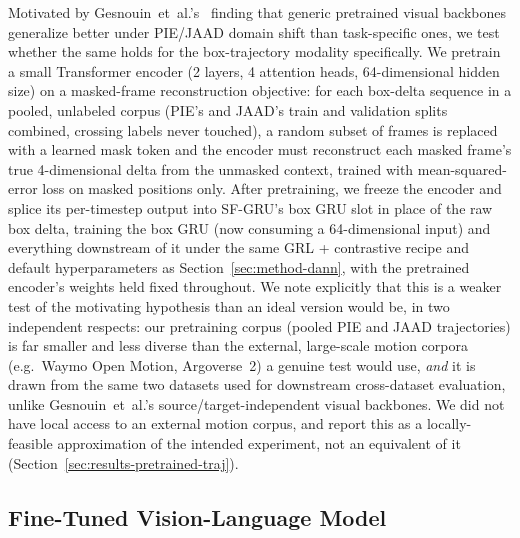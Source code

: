 Motivated by Gesnouin~et~al.'s~\cite{gesnouin2022} finding that generic
pretrained visual backbones generalize better under PIE/JAAD domain
shift than task-specific ones, we test whether the same holds for the
box-trajectory modality specifically. We pretrain a small Transformer
encoder (2 layers, 4 attention heads, 64-dimensional hidden size) on a
masked-frame reconstruction objective: for each box-delta sequence in a
pooled, unlabeled corpus (PIE's and JAAD's train and validation splits
combined, crossing labels never touched), a random subset of frames is
replaced with a learned mask token and the encoder must reconstruct
each masked frame's true 4-dimensional delta from the unmasked context,
trained with mean-squared-error loss on masked positions only. After
pretraining, we freeze the encoder and splice its per-timestep output
into SF-GRU's box GRU slot in place of the raw box delta, training the
box GRU (now consuming a 64-dimensional input) and everything
downstream of it under the same GRL + contrastive recipe and default
hyperparameters as Section~\ref{sec:method-dann}, with the pretrained
encoder's weights held fixed throughout. We note explicitly that this
is a weaker test of the motivating hypothesis than an ideal version
would be, in two independent respects: our pretraining corpus (pooled
PIE and JAAD trajectories) is far smaller and less diverse than the
external, large-scale motion corpora (e.g.\ Waymo Open Motion,
Argoverse~2) a genuine test would use, \emph{and} it is drawn from the
same two datasets used for downstream cross-dataset evaluation, unlike
Gesnouin~et~al.'s source/target-independent visual backbones. We did
not have local access to an external motion corpus, and report this as
a locally-feasible approximation of the intended experiment, not an
equivalent of it (Section~\ref{sec:results-pretrained-traj}).

\subsection{Fine-Tuned Vision-Language Model}
\label{sec:method-vlm}

